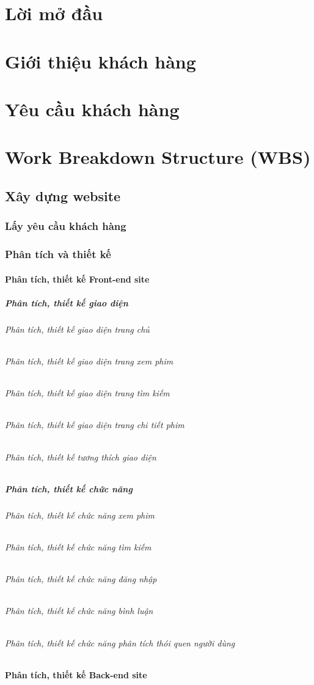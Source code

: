 \documentclass[a4paper]{book}
\begin{document}
\chapter*{Lời mở đầu}
\chapter{Giới thiệu khách hàng}
\chapter{Yêu cầu khách hàng}
\chapter{Work Breakdown Structure (WBS)}
\section{Xây dựng website}
\subsection{Lấy yêu cầu khách hàng}
\subsection{Phân tích và thiết kế}
\subsubsection{Phân tích, thiết kế Front-end site}
\paragraph{Phân tích, thiết kế giao diện}
\subparagraph{Phân tích, thiết kế giao diện trang chủ}
\subparagraph{Phân tích, thiết kế giao diện trang xem phim}
\subparagraph{Phân tích, thiết kế giao diện trang tìm kiếm}
\subparagraph{Phân tích, thiết kế giao diện trang chi tiết phim}
\subparagraph{Phân tích, thiết kế tương thích giao diện}
\paragraph{Phân tích, thiết kế chức năng}
\subparagraph{Phân tích, thiết kế chức năng xem phim}
\subparagraph{Phân tích, thiết kế chức năng tìm kiếm}
\subparagraph{Phân tích, thiết kế chức năng đăng nhập}
\subparagraph{Phân tích, thiết kế chức năng bình luận}
\subparagraph{Phân tích, thiết kế chức năng phân tích thói quen người dùng}
\subsubsection{Phân tích, thiết kế Back-end site}
\end{document}
